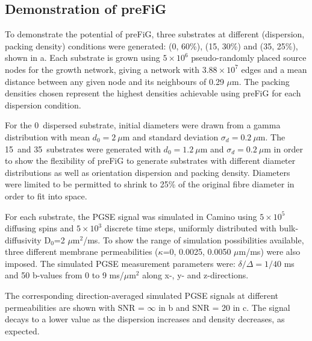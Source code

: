 \subsection{Demonstration of \ac{preFiG}}
\label{sec:ipmi_demonstration}
To demonstrate the potential of \ac{preFiG}, three substrates at different (dispersion, packing density) conditions were generated: (0\degree, 60\%), (15\degree, 30\%) and (35\degree, 25\%), shown in a.
Each substrate is grown using $5 \times 10^6$ pseudo-randomly placed source nodes for the growth network, giving a network with $3.88\times10^7$  edges and a mean distance between any given node and its neighbours of 0.29 $\mu$m.
The packing densities chosen represent the highest densities achievable using \ac{preFiG} for each dispersion condition.


For the 0\degree\ dispersed substrate, initial diameters were drawn from a gamma distribution with mean $d_0 = 2\ \mu$m and standard deviation $\sigma_d = 0.2\ \mu$m. The 15\degree\ and 35\degree\ substrates were generated with $d_0 = 1.2\ \mu$m and $\sigma_d = 0.2\ \mu$m in order to show the flexibility of \ac{preFiG} to generate substrates with different diameter distributions as well as orientation dispersion and packing density. Diameters were limited to be permitted to shrink to 25\% of the original fibre diameter in order to fit into space.

For each substrate, the \acf{PGSE} signal was simulated in Camino\cite{Cook2006} using $5\times 10^5$ diffusing spins and $5\times 10^3$ discrete time steps, uniformly distributed with bulk-diffusivity D$_0$=2 $\mu$m$^2$/ms. To show the range of simulation possibilities available, three different membrane permeabilities ($\kappa$=0, 0.0025, 0.0050 $\mu$m/ms) were also imposed.
The simulated \ac{PGSE} measurement parameters were: $\delta/\Delta=1/40$ ms and 50 b-values from 0 to 9 ms/$\mu$m$^2$ along x-, y- and z-directions.

The corresponding direction-averaged simulated \ac{PGSE} signals at different permeabilities are shown with SNR = $\infty$ in b and SNR = 20 in c.
The signal decays to a lower value as the dispersion increases and density decreases, as expected.

